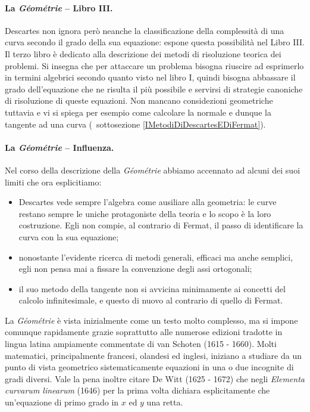 \paragraph{La \textit{G\'eom\'etrie} -- Libro III.} Descartes non ignora per\`o neanche la classificazione della complessit\`a di una curva secondo il grado della sua equazione: espone questa possibilit\`a nel Libro III. Il terzo libro \`e dedicato alla descrizione dei metodi di risoluzione teorica dei problemi. Si insegna che per attaccare un problema bisogna riuscire ad esprimerlo in termini algebrici secondo quanto visto nel libro I, quindi bisogna abbassare il grado dell'equazione che ne risulta il pi\`u possibile e servirsi di strategie canoniche di risoluzione di queste equazioni. Non mancano considezioni geometriche tuttavia e vi si spiega per esempio come calcolare la normale e dunque la tangente ad una curva (\Cfr\ sottosezione \ref{IMetodiDiDescartesEDiFermat}).
\paragraph{La \textit{G\'eom\'etrie} -- Influenza.} Nel corso della descrizione della \textit{G\'eom\'etrie} abbiamo accennato ad alcuni dei suoi limiti che ora esplicitiamo:
\begin{itemize}
	\item Descartes vede sempre l'algebra come ausiliare alla geometria: le curve restano sempre le uniche protagoniste della teoria e lo scopo \`e la loro costruzione. Egli non compie, al contrario di Fermat, il passo di identificare la curva con la sua equazione;
	\item nonostante l'evidente ricerca di metodi generali, efficaci ma anche semplici, egli non pensa mai a fissare la convenzione degli assi ortogonali;
	\item il suo metodo della tangente non si avvicina minimamente ai concetti del calcolo infinitesimale, e questo di nuovo al contrario di quello di Fermat.
\end{itemize}
\par La \textit{G\'eom\'etrie} \`e vista inizialmente come un testo molto complesso, ma si impone comunque rapidamente grazie soprattutto alle numerose edizioni tradotte in lingua latina ampiamente commentate di van Schoten (1615 - 1660). Molti matematici, principalmente francesi, olandesi ed inglesi, iniziano a studiare da un punto di vista geometrico sistematicamente equazioni in una o due incognite di gradi diversi. Vale la pena inoltre citare De Witt (1625 - 1672) che negli \textit{Elementa curvarum linearum} (1646) per la prima volta dichiara esplicitamente che un'equazione di primo grado in $x$ ed $y$  una retta.
